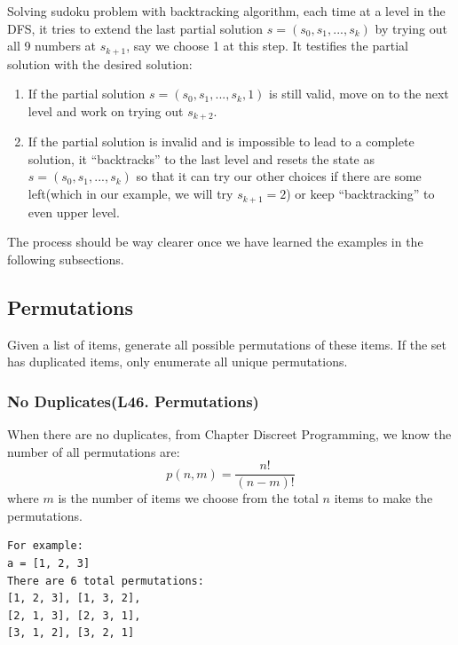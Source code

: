 \documentclass[../main.tex]{subfiles}
\begin{document}
Solving sudoku problem with backtracking algorithm, each time at a level in the DFS,  it tries to extend the last partial solution $s = (s_0, s_1, ..., s_{k})$ by trying out all 9 numbers at $s_{k+1}$, say we choose 1 at this step. It  testifies the partial solution with the desired solution:
\begin{enumerate}
    \item If the partial solution $s = (s_0, s_1, ..., s_{k}, 1)$ is still valid, move on to the next level and work on trying out $s_{k+2}$.
    \item If the partial solution is invalid and is impossible to lead to a complete solution, it ``backtracks'' to the last level and resets the state as $s = (s_0, s_1, ..., s_{k})$ so that it can try our other choices if there are some left(which in our example, we will try $s_{k+1}=2$) or keep ``backtracking'' to even upper level.
\end{enumerate}
The process should be way clearer once we have learned the examples in the following subsections. 

\subsection{Permutations}
Given a list of items, generate all possible permutations of these items. If the set has duplicated items, only enumerate all unique permutations.
\subsubsection{No Duplicates(L46. Permutations)} When there are no duplicates, from Chapter Discreet Programming, we know the number of all permutations are:
\begin{equation}
    p(n, m) = \frac{n!}{(n-m)!}
\end{equation}
where $m$ is the number of items we choose from the total $n$ items to make the permutations. 
\begin{lstlisting}[numbers=none]
For example:
a = [1, 2, 3]
There are 6 total permutations:
[1, 2, 3], [1, 3, 2],
[2, 1, 3], [2, 3, 1],
[3, 1, 2], [3, 2, 1]
\end{lstlisting}
\end{document}
